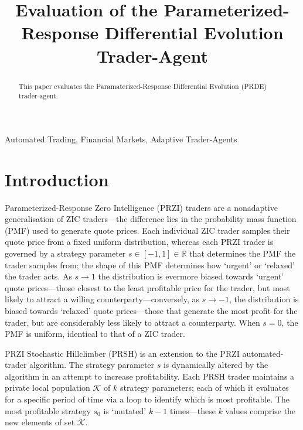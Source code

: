 \documentclass[conference]{IEEEtran}
\begin{document}
\title{Evaluation of the Parameterized-Response Differential Evolution Trader-Agent}

\author{
}

\maketitle

\begin{abstract}
This paper evaluates the Paramaterized-Response Differential Evolution (PRDE) trader-agent.
\end{abstract}

\begin{IEEEkeywords}
Automated Trading, Financial Markets, Adaptive Trader-Agents
\end{IEEEkeywords}

\section{Introduction}

Parameterized-Response Zero Intelligence (PRZI) \cite{PRZI} traders are a nonadaptive generalisation of ZIC \cite{GodeSunder} traders---the difference lies in the probability mass function (PMF) used to generate quote prices.
Each individual ZIC trader samples their quote price from a fixed uniform distribution, whereas each PRZI trader is governed by a strategy parameter $s\in[-1, 1]\in\mathbb{R}$ that determines the PMF the trader samples from; the shape of this PMF determines how `urgent' or `relaxed' the trader acts.
As $s\to1$ the distribution is evermore biased towards `urgent' quote prices---those closest to the least profitable price for the trader, but most likely to attract a willing counterparty---conversely, as $s\to-1$, the distribution is biased towards `relaxed' quote prices---those that generate the most profit for the trader, but are considerably less likely to attract a counterparty.
When $s=0$, the PMF is uniform, identical to that of a ZIC trader.

PRZI Stochastic Hillclimber (PRSH) \cite{PRSH} is an extension to the PRZI automated-trader algorithm.
The strategy parameter $s$ is dynamically altered by the algorithm in an attempt to increase profitability.
Each PRSH trader maintains a private local population $\mathcal{K}$ of $k$ strategy parameters; each of which it evaluates for a specific period of time via a loop to identify which is most profitable.
The most profitable strategy $s_0$ is `mutated' $k-1$ times---these $k$ values comprise the new elements of set $\mathcal{K}$.
\end{document}
